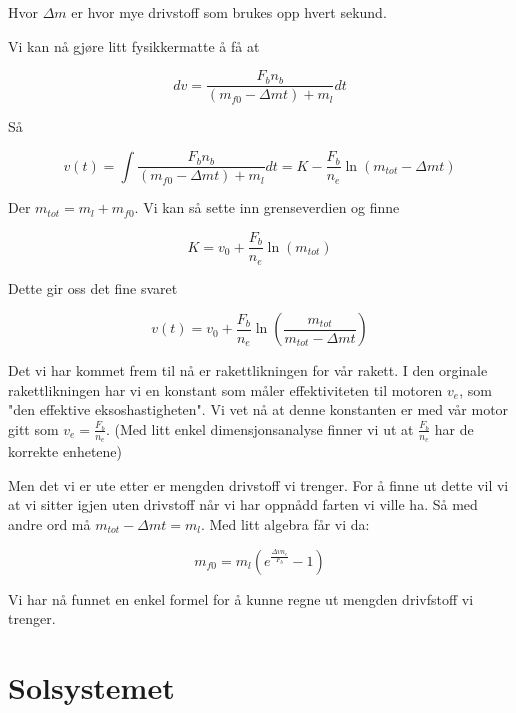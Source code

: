 \documentclass[a4paper,norsk,11pt,twoside]{article}
\begin{document}
Hvor $\Delta m$ er hvor mye drivstoff som brukes opp hvert sekund.

Vi kan nå gjøre litt fysikkermatte å få at

\begin{equation}
dv = \frac{F_b n_b}{(m_{f0} - \Delta m t) + m_l} dt
\end{equation} 

Så

\begin{equation}
v(t) = \int \frac{F_b n_b}{(m_{f0} - \Delta m t) + m_l} dt
= K - \frac{F_b}{n_e} \ln(m_{tot} - \Delta m t) 
\end{equation}

Der $m_{tot} = m_l + m_{f0}$. Vi kan så sette inn grenseverdien og finne

\begin{equation}
K = v_0 + \frac{F_b}{n_e} \ln (m_{tot})
\end{equation}

Dette gir oss det fine svaret

\begin{equation}
v(t) =v_0 + \frac{F_b}{n_e} \ln \left(\frac{m_{tot}}{m_{tot} - \Delta m t} \right)
\end{equation}

Det vi har kommet frem til nå er rakettlikningen for vår rakett. I den orginale rakettlikningen har vi en konstant som måler effektiviteten til motoren $v_e$, som "den effektive eksoshastigheten". Vi vet nå at denne konstanten er med vår motor gitt som $v_e = \frac{F_b}{n_e}$. (Med litt enkel dimensjonsanalyse finner vi ut at $\frac{F_b}{n_e}$ har de korrekte enhetene)

Men det vi er ute etter er mengden drivstoff vi trenger. For å finne ut dette vil vi at vi sitter igjen uten drivstoff når vi har oppnådd farten vi ville ha. Så med andre ord må $m_{tot} - \Delta m t = m_l$. Med litt algebra får vi da:

\begin{equation}
m_{f0} = m_l(e^{\frac{\Delta v n_e}{F_b}} - 1)
\end{equation}

Vi har nå funnet en enkel formel for å kunne regne ut mengden drivfstoff vi trenger.
\newpage



\part{Solsystemet}
\end{document}
